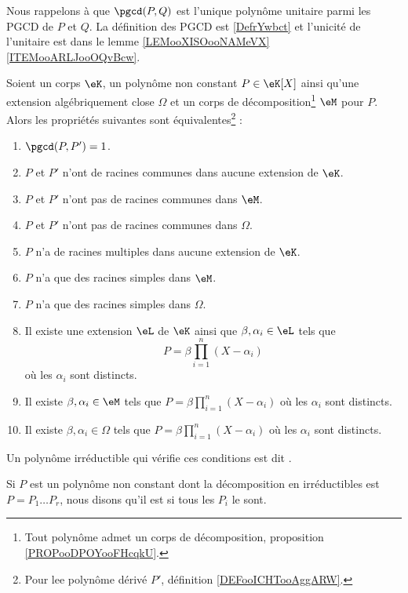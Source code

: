 Nous rappelons à  que \( \pgcd(P,Q)\) est l'unique polynôme unitaire parmi les PGCD de \( P\) et \( Q\). La définition des PGCD est \ref{DefrYwbct} et l'unicité de l'unitaire est dans le lemme \ref{LEMooXISOooNAMeVX}\ref{ITEMooARLJooOQvBcw}.

\begin{propositionDef}       \label{PROPooPRGQooOkEmag}
    Soient un corps \( \eK\), un polynôme non constant \( P\in \eK[X]\) ainsi qu'une extension algébriquement close \( \Omega\) et un corps de décomposition\footnote{Tout polynôme admet un corps de décomposition, proposition \ref{PROPooDPOYooFHcqkU}.} \( \eM\) pour \( P\). Alors les propriétés suivantes sont équivalentes\footnote{Pour lee polynôme dérivé \( P'\), définition \ref{DEFooICHTooAggARW}.} :
    \begin{enumerate}
        \item       \label{ITEMooVMJLooUdZLQR}
            \( \pgcd(P,P')=1\).
        \item
            \( P\) et \( P'\) n'ont de racines communes dans aucune extension de \( \eK\).
        \item
            \( P\) et \( P'\) n'ont pas de racines communes dans \( \eM\).
        \item
            \( P\) et \( P'\) n'ont pas de racines communes dans \( \Omega\).
        \item       \label{ITEMooARPLooBoUrxX}
            \( P\) n'a de racines multiples dans aucune extension de \( \eK\).
        \item
            \( P\) n'a que des racines simples dans \( \eM\).
        \item
            \( P\) n'a que des racines simples dans \( \Omega\).
        \item
            Il existe une extension \( \eL\) de \( \eK\) ainsi que \( \beta,\alpha_i\in \eL\) tels que
            \begin{equation}
                P=\beta\prod_{i=1}^n(X-\alpha_i)
            \end{equation}
            où les \( \alpha_i\) sont distincts.
        \item
            Il existe \( \beta,\alpha_i\in \eM\) tels que $P=\beta\prod_{i=1}^n(X-\alpha_i)$ où les \( \alpha_i\) sont distincts.
        \item
            Il existe \( \beta,\alpha_i\in \Omega\) tels que $P=\beta\prod_{i=1}^n(X-\alpha_i)$ où les \( \alpha_i\) sont distincts.
    \end{enumerate}
    Un polynôme irréductible qui vérifie ces conditions est dit .

	Si \( P\) est un polynôme non constant dont la décomposition en irréductibles est \( P=P_1\ldots P_r\), nous disons qu'il est  si tous les \( P_i\) le sont.
\end{propositionDef}

